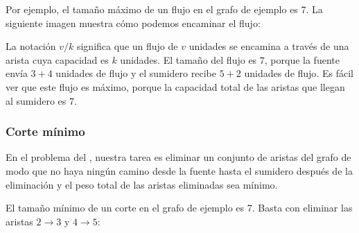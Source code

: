 Por ejemplo, el tamaño máximo de un flujo
en el grafo de ejemplo es 7.
La siguiente imagen muestra cómo podemos
encaminar el flujo:

\begin{center}
\end{center}

La notación $v/k$ significa
que un flujo de $v$ unidades se encamina a través de
una arista cuya capacidad es $k$ unidades.
El tamaño del flujo es $7$,
porque la fuente envía $3+4$ unidades de flujo
y el sumidero recibe $5+2$ unidades de flujo.
Es fácil ver que este flujo es máximo,
porque la capacidad total de las aristas
que llegan al sumidero es $7$.

\subsubsection{Corte mínimo}


En el problema del ,
nuestra tarea es eliminar un conjunto
de aristas del grafo
de modo que no haya ningún camino desde la fuente
hasta el sumidero después de la eliminación
y el peso total de las aristas eliminadas
sea mínimo.

El tamaño mínimo de un corte en el grafo de ejemplo es 7.
Basta con eliminar las aristas $2 \rightarrow 3$
y $4 \rightarrow 5$:

